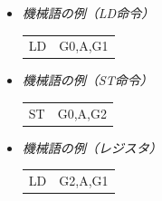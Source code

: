 \documentclass[handout]{beamer}        %
\begin{document}
\begin{frame}
  \begin{itemize}
  \item \emph{機械語の例（LD命令）} \\
    {\ttfamily\vspace{-0.7cm}\begin{center}
      \begin{tabular}{l l}
        LD & G0,A,G1 \\
      \end{tabular}
    \end{center}}
    \vfill
  \item \emph{機械語の例（ST命令）} \\
    {\ttfamily\vspace{-0.7cm}\begin{center}
      \begin{tabular}{l l}
        ST & G0,A,G2 \\
      \end{tabular}
    \end{center}}
    \vfill
  \item \emph{機械語の例（レジスタ）} \\
    {\ttfamily\vspace{-0.7cm}\begin{center}
      \begin{tabular}{l l}
        LD & G2,A,G1 \\
      \end{tabular}
    \end{center}}
  \vfill
  \end{itemize}
  \vfill
  \vfill
\end{frame}
\end{document}
